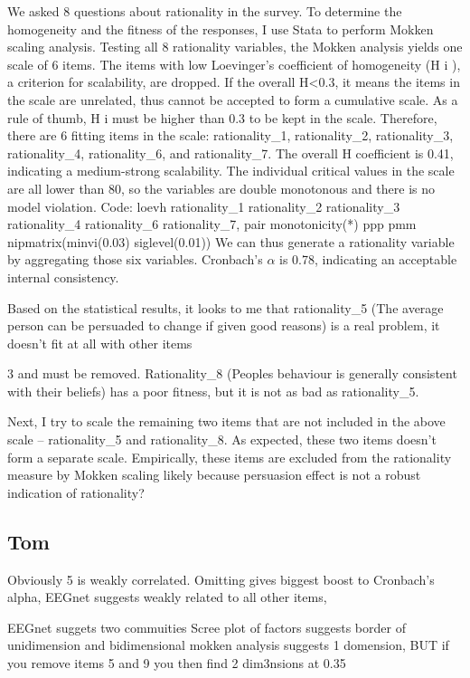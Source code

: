 \documentclass[
  ,jou,floatsintext]{apa6}
\begin{document}
We asked 8 questions about rationality in the survey. To determine the homogeneity and the
fitness of the responses, I use Stata to perform Mokken scaling analysis. Testing all 8
rationality variables, the Mokken analysis yields one scale of 6 items. The items with low
Loevinger's coefficient of homogeneity (H i ), a criterion for scalability, are dropped. If the
overall H\textless0.3, it means the items in the scale are unrelated, thus cannot be accepted to form a
cumulative scale. As a rule of thumb, H i must be higher than 0.3 to be kept in the scale.
Therefore, there are 6 fitting items in the scale: rationality\_1, rationality\_2, rationality\_3,
rationality\_4, rationality\_6, and rationality\_7. The overall H coefficient is 0.41, indicating a
medium-strong scalability. The individual critical values in the scale are all lower than 80, so
the variables are double monotonous and there is no model violation.
Code: loevh rationality\_1 rationality\_2 rationality\_3 rationality\_4 rationality\_6 rationality\_7,
pair monotonicity(*) ppp pmm nipmatrix(minvi(0.03) siglevel(0.01))
We can thus generate a rationality variable by aggregating those six variables. Cronbach's \(\alpha\)
is 0.78, indicating an acceptable internal consistency.

Based on the statistical results, it looks to me that rationality\_5 (The average person can be
persuaded to change if given good reasons) is a real problem, it doesn't fit at all with other items

3
and must be removed. Rationality\_8 (People\textquotesingle s behaviour is generally consistent with their beliefs)
has a poor fitness, but it is not as bad as rationality\_5.

Next, I try to scale the remaining two items that are not included in the above scale --
rationality\_5 and rationality\_8. As expected, these two items doesn't form a separate scale.
Empirically, these items are excluded from the rationality measure by Mokken scaling likely
because persuasion effect is not a robust indication of rationality?

\hypertarget{tom}{%
\subsection{Tom}\label{tom}}

Obviously 5 is weakly correlated. Omitting gives biggest boost to Cronbach's alpha, EEGnet suggests weakly related to all other items,

EEGnet suggets two commuities
Scree plot of factors suggests border of unidimension and bidimensional
mokken analysis suggests 1 domension, BUT if you remove items 5 and 9 you then find 2 dim3nsions at 0.35
\end{document}
